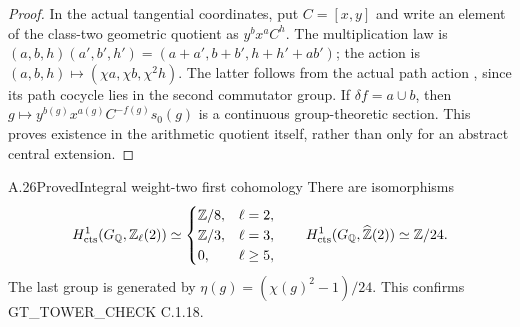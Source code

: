 \begin{proof}
In the actual tangential coordinates, put $C=[x,y]$ and write an
element of the class-two geometric quotient as $y^b x^a C^h$.
The multiplication law is
$(a,b,h)(a',b',h')=(a+a',b+b',h+h'+ab')$; the action is
$(a,b,h)\mapsto(\chi a,\chi b,\chi^2h)$.
The latter follows from the actual path action
\cite[(12.11)--(12.15)]{CohWickelgren2012}, since its path cocycle
lies in the second commutator group. If $\delta f=a\cup b$, then
$g\mapsto y^{b(g)}x^{a(g)}C^{-f(g)}s_0(g)$ is a continuous
group-theoretic section. This proves existence in the arithmetic
quotient itself, rather than only for an abstract central extension.
\end{proof}

\begin{result}{A.26}{Proved}{Integral weight-two first cohomology}
\label{coh:h1}
There are isomorphisms
\[
 H^1_{\rm cts}(G_{\mathbb Q},\mathbb Z_\ell(2))\simeq
 \begin{cases}\mathbb Z/8,&\ell=2,\\
               \mathbb Z/3,&\ell=3,\\
               0,&\ell\geq5,
 \end{cases}
 \qquad
 H^1_{\rm cts}(G_{\mathbb Q},\widehat{\mathbb Z}(2))
       \simeq\mathbb Z/24.
\]
The last group is generated by
$\eta(g)=(\chi(g)^2-1)/24$. This confirms
GT\_TOWER\_CHECK C.1.18.
\end{result}
